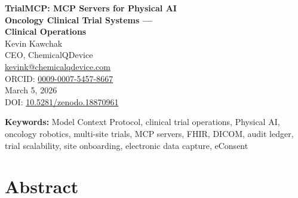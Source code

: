 \documentclass[10pt,letterpaper]{article}
\begin{document}
\begin{center}
{\LARGE\bfseries\color{headerblue} TrialMCP: MCP Servers for Physical AI\\[4pt]
Oncology Clinical Trial Systems ---\\[4pt]
Clinical Operations}\\[16pt]

{\large Kevin Kawchak}\\[4pt]
{\normalsize CEO, ChemicalQDevice}\\[2pt]
{\small\href{mailto:kevink@chemicalqdevice.com}{kevink@chemicalqdevice.com}}\\[2pt]
{\small ORCID: \href{https://orcid.org/0009-0007-5457-8667}{0009-0007-5457-8667}}\\[12pt]

{\normalsize March 5, 2026}\\[8pt]

{\small DOI: \href{https://doi.org/10.5281/zenodo.18870961}{10.5281/zenodo.18870961}}\\[16pt]
\end{center}

\noindent\textbf{Keywords:} Model Context Protocol, clinical trial operations, Physical AI, oncology robotics, multi-site trials, MCP servers, FHIR, DICOM, audit ledger, trial scalability, site onboarding, electronic data capture, eConsent

\vspace{12pt}

\section*{Abstract}
\end{document}

